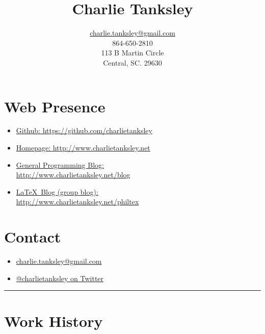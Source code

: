\documentclass{article}
\title{Charlie Tanksley}
\author{\href{mailto:charlie.tanksley@gmail.com}{charlie.tanksley@gmail.com}\\
        864-650-2810\\
        113 B Martin Circle\\
        Central, SC. 29630}
\date{\nodate}
\begin{document}
\setlength{\droptitle}{-1in}
\maketitle
\thispagestyle{fancy}

\begin{multicols}{2}

\section{Web Presence} %
\label{sec:Web Presence}

\begin{itemize}
  \item \href{https://github.com/charlietanksley}{Github:
    https://github.com/charlietanksley}
  \item \href{http://www.charlietanksley.net}{Homepage:
    http://www.charlietanksley.net}
  \item \href{http://www.charlietanksley.net/blog}{General Programming Blog:\\
    http://www.charlietanksley.net/blog}
  \item \href{http://www.charlietanksley.net/philtex}{\LaTeX\ Blog (group blog):\\
    http://www.charlietanksley.net/philtex}
\end{itemize}

\columnbreak
\section{Contact} %
\label{sec:Contact}

\begin{itemize}
  \item 
    \href{mailto:charlie.tanksley@gmail.com}{charlie.tanksley@gmail.com}
  \item \href{http://www.twitter.com/charlietanksley}{@charlietanksley 
    on Twitter}
\end{itemize}


\end{multicols}
\hrule
\section{Work History} %
\label{sec:Relevant Work History}
\end{document}
